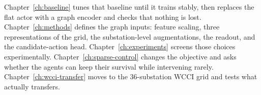 Chapter~\ref{ch:baseline} tunes that baseline until it trains stably, then
replaces the flat actor with a graph encoder and checks that nothing is lost.
Chapter~\ref{ch:methods} defines the graph inputs: feature scaling, three
representations of the grid, the substation-level augmentations, the readout,
and the candidate-action head. Chapter~\ref{ch:experiments} screens those
choices experimentally. Chapter~\ref{ch:sparse-control} changes the objective
and asks whether the agents can keep their survival while intervening rarely.
Chapter~\ref{ch:wcci-transfer} moves to the 36-substation WCCI grid and tests
what actually transfers.
